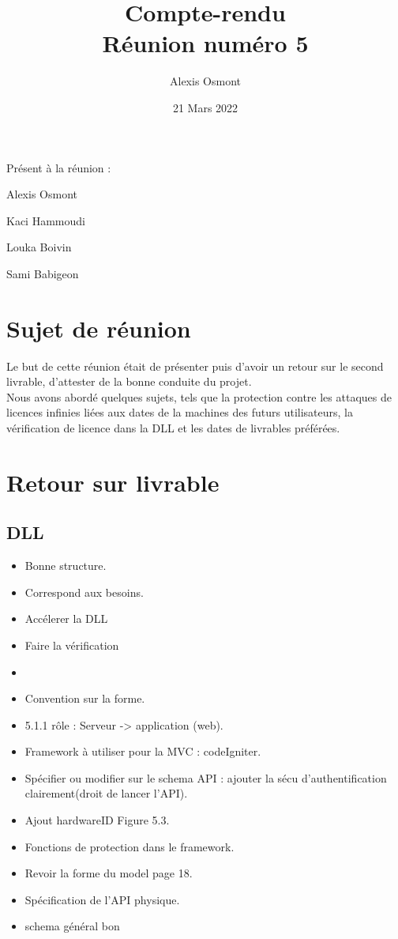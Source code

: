 \documentclass{article}
\title{
    \Huge
    Compte-rendu\\
    Réunion numéro 5\\
}
\date{\huge 21 Mars 2022}
\author{\huge Alexis Osmont\\}
\begin{document}
\maketitle
\vspace{5cm}
    Présent à la réunion :
    \begin{description}
        \item Alexis Osmont
        \item Kaci Hammoudi
        \item Louka  Boivin
        \item Sami Babigeon
    \end{description}
\newpage

\section{Sujet de réunion}   

Le but de cette réunion était de présenter puis d'avoir un retour sur le second livrable, d'attester de la bonne conduite du projet.\\

Nous avons abordé quelques sujets, tels que la protection contre les attaques de licences infinies liées aux dates de la machines
des futurs utilisateurs, la vérification de licence dans la DLL et les dates de livrables préférées. 
\vspace{0.5cm}

\section{Retour sur livrable}
\subsection{DLL}

\begin{itemize}
    \item Bonne structure. 
    \item Correspond aux besoins.
    \item Accélerer la DLL 
    \item Faire la vérification
    \item 
    \item Convention sur la forme.
    \item 5.1.1 rôle : Serveur -> application (web).
    \item Framework à utiliser pour la MVC : codeIgniter.
    \item Spécifier ou modifier sur le schema API : ajouter la sécu d'authentification clairement(droit de lancer l'API).
    \item Ajout hardwareID Figure 5.3.
    \item Fonctions de protection dans le framework.
    \item Revoir la forme du model page 18.
    \item Spécification de l'API physique. 
    \item schema général bon
\end{itemize}
\end{document}
